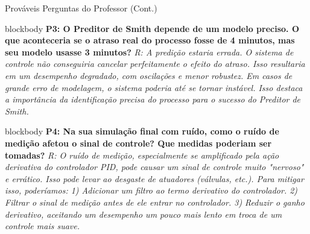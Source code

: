 \documentclass{beamer}
\begin{document}
\begin{frame}[fragile]{Prováveis Perguntas do Professor (Cont.)}
    \begin{beamercolorbox}[rounded=true,shadow=true]{blockbody}
        \textbf{P3: O Preditor de Smith depende de um modelo preciso. O que aconteceria se o atraso real do processo fosse de 4 minutos, mas seu modelo usasse 3 minutos?}
        \pause
        \textit{R: A predição estaria errada. O sistema de controle não conseguiria cancelar perfeitamente o efeito do atraso. Isso resultaria em um desempenho degradado, com oscilações e menor robustez. Em casos de grande erro de modelagem, o sistema poderia até se tornar instável. Isso destaca a importância da identificação precisa do processo para o sucesso do Preditor de Smith.}
    \end{beamercolorbox}
    \vspace{1em}
    \pause
    \begin{beamercolorbox}[rounded=true,shadow=true]{blockbody}
        \textbf{P4: Na sua simulação final com ruído, como o ruído de medição afetou o sinal de controle? Que medidas poderiam ser tomadas?}
        \pause
        \textit{R: O ruído de medição, especialmente se amplificado pela ação derivativa do controlador PID, pode causar um sinal de controle muito "nervoso" e errático. Isso pode levar ao desgaste de atuadores (válvulas, etc.). Para mitigar isso, poderíamos: 1) Adicionar um filtro ao termo derivativo do controlador. 2) Filtrar o sinal de medição antes de ele entrar no controlador. 3) Reduzir o ganho derivativo, aceitando um desempenho um pouco mais lento em troca de um controle mais suave.}
    \end{beamercolorbox}
\end{frame}
\end{document}
